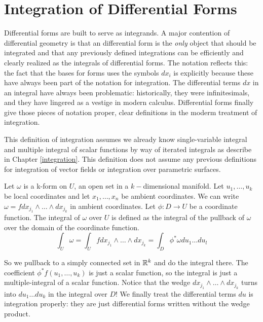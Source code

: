 \documentclass[fleqn,letterpaper]{report}
\begin{document}
\section{Integration of Differential Forms}
\label{integration-differential-forms}

Differential forms are built to serve as integrands. A major
contention of differential geometry is that an differential
form is the \emph{only} object that should be integrated and
that any previously defined integrations can be efficiently
and clearly realized as the integrals of differential forms.
The notation reflects this: the fact that the bases for forms
uses the symbols $dx_i$ is explicitly because these have
always been part of the notation for integration. The
differential terms $dx$ in an integral have always been
problematic: historically, they were infinitesimals, and they
have lingered as a vestige in modern calculus. Differential
forms finally give those pieces of notation proper, clear
definitions in the moderm treatment of integration.

This definition of integration assumes we already know
single-variable integral and multiple integral of scalar
functions by way of iterated integrals as describe in Chapter
\ref{integration}. This definition does not assume any
previous definitions for integration of vector fields or
integration over parametric surfaces. 

\begin{defn}
Let $\omega$ is a k-form on $U$, an open set in a
$k-$dimensional manifold. Let $u_1, \ldots, u_k$ be local
coordinates and let $x_1, \ldots, x_n$ be ambient coordinates.
We can write $\omega = f dx_{j_1} \wedge \ldots \wedge
dx_{j_k}$ in ambient coordinates. Let $\phi :D \rightarrow U$
be a coordinate function. The integral of $\omega$ over $U$ is
defined as the integral of the pullback of $\omega$ over the
domain of the coordinate function.
\begin{equation*}
\int_U \omega = \int_U f dx_{j_1} \wedge \ldots \wedge dx_{j_k} =
\int_D \phi^* \omega du_1 \ldots du_l
\end{equation*}
\end{defn}

So we pullback to a simply connected set in $\mathbb{R}^k$ and do the
integral there. The coefficient $\phi^* f(u_1, \ldots, u_k)$
is just a scalar function, so the integral is just a
multiple-integral of a scalar function. Notice that the wedge
$dx_{j_1} \wedge \ldots \wedge dx_{j_k}$ turns into $du_1 \ldots du_k$
in the integral over $D$! We finally treat the differential
terms $du$ is integration properly: they are just differential
forms written without the wedge product. 
\end{document}
